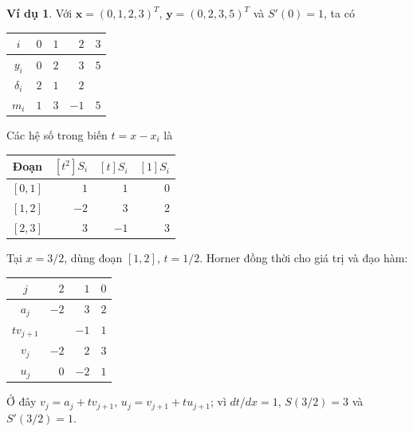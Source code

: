 \documentclass[12pt,a4paper,oneside]{book}
\numberwithin{algorithm}{chapter}
\theoremstyle{definition}
\newtheorem{vidu}{Ví dụ}[chapter]
\begin{document}
\begin{vidu}
Với $\boldsymbol x=(0,1,2,3)^T$, $\boldsymbol y=(0,2,3,5)^T$ và $S'(0)=1$, ta có
\begin{center}
\begin{tabular}{c|rrrr}\toprule
$i$&$0$&$1$&$2$&$3$\\\midrule
$y_i$&$0$&$2$&$3$&$5$\\
$\delta_i$&$2$&$1$&$2$&\\
$m_i$&$1$&$3$&$-1$&$5$\\\bottomrule
\end{tabular}
\end{center}
Các hệ số trong biến $t=x-x_i$ là
\begin{center}
\begin{tabular}{c|rrr}\toprule
Đoạn&$[t^2]S_i$&$[t]S_i$&$[1]S_i$\\\midrule
$[0,1]$&$1$&$1$&$0$\\
$[1,2]$&$-2$&$3$&$2$\\
$[2,3]$&$3$&$-1$&$3$\\\bottomrule
\end{tabular}
\end{center}
Tại $x=3/2$, dùng đoạn $[1,2]$, $t=1/2$. Horner đồng thời cho giá trị và đạo hàm:
\begin{center}
\begin{tabular}{c|rrr}\toprule
$j$&$2$&$1$&$0$\\\midrule
$a_j$&$-2$&$3$&$2$\\
$t v_{j+1}$&&$-1$&$1$\\
$v_j$&$-2$&$2$&$\boxed{3}$\\
$u_j$&$0$&$-2$&$\boxed{1}$\\\bottomrule
\end{tabular}
\end{center}
Ở đây $v_j=a_j+tv_{j+1}$, $u_j=v_{j+1}+tu_{j+1}$; vì $dt/dx=1$, $S(3/2)=3$ và $S'(3/2)=1$.
\end{vidu}
\end{document}
